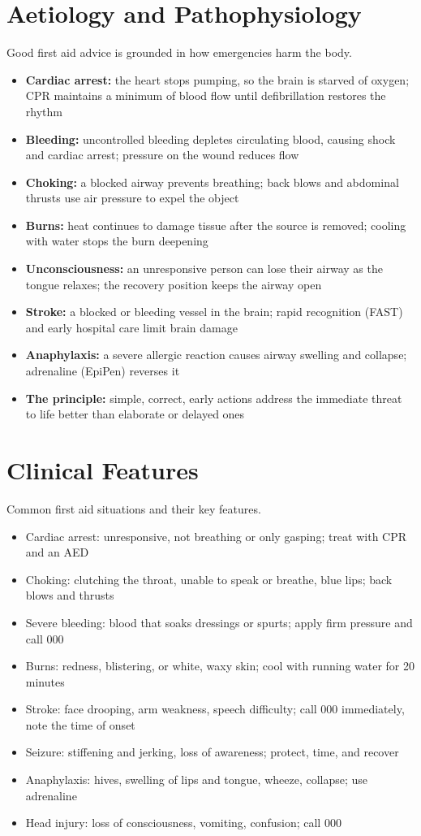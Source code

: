 \section*{Aetiology and Pathophysiology}
Good first aid advice is grounded in how emergencies harm the body.
\begin{itemize}
    \item \textbf{Cardiac arrest:} the heart stops pumping, so the brain is starved of oxygen; CPR maintains a minimum of blood flow until defibrillation restores the rhythm
    \item \textbf{Bleeding:} uncontrolled bleeding depletes circulating blood, causing shock and cardiac arrest; pressure on the wound reduces flow
    \item \textbf{Choking:} a blocked airway prevents breathing; back blows and abdominal thrusts use air pressure to expel the object
    \item \textbf{Burns:} heat continues to damage tissue after the source is removed; cooling with water stops the burn deepening
    \item \textbf{Unconsciousness:} an unresponsive person can lose their airway as the tongue relaxes; the recovery position keeps the airway open
    \item \textbf{Stroke:} a blocked or bleeding vessel in the brain; rapid recognition (FAST) and early hospital care limit brain damage
    \item \textbf{Anaphylaxis:} a severe allergic reaction causes airway swelling and collapse; adrenaline (EpiPen) reverses it
    \item \textbf{The principle:} simple, correct, early actions address the immediate threat to life better than elaborate or delayed ones
\end{itemize}

\section*{Clinical Features}
Common first aid situations and their key features.
\begin{itemize}
    \item Cardiac arrest: unresponsive, not breathing or only gasping; treat with CPR and an AED
    \item Choking: clutching the throat, unable to speak or breathe, blue lips; back blows and thrusts
    \item Severe bleeding: blood that soaks dressings or spurts; apply firm pressure and call 000
    \item Burns: redness, blistering, or white, waxy skin; cool with running water for 20 minutes
    \item Stroke: face drooping, arm weakness, speech difficulty; call 000 immediately, note the time of onset
    \item Seizure: stiffening and jerking, loss of awareness; protect, time, and recover
    \item Anaphylaxis: hives, swelling of lips and tongue, wheeze, collapse; use adrenaline
    \item Head injury: loss of consciousness, vomiting, confusion; call 000
\end{itemize}


